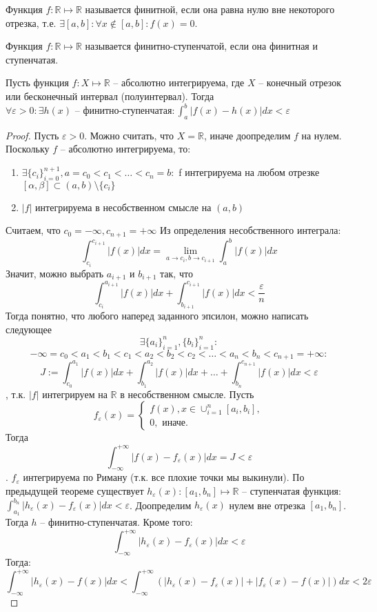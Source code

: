 \documentclass[document.tex]{subfiles}
\begin{document}
\begin{definition}
Функция $f: \mathbb{R} \mapsto \mathbb{R}$ называется финитной, если она равна нулю вне некоторого отрезка, т.е. $\exists [a, b] : \forall x \not \in [a, b] : f(x) = 0$.
\end{definition}

\begin{definition}
Функция $f : \mathbb{R} \mapsto \mathbb{R}$ называется финитно-ступенчатой, если она финитная и ступенчатая.
\end{definition}

\begin{theorem}
    Пусть функция $f : X \mapsto \mathbb{R}$ -- абсолютно интегрируема, где $X$ -- конечный отрезок или
    бесконечный интервал (полуинтервал). Тогда $\forall \varepsilon > 0: \exists h(x)\text{ -- финитно-ступенчатая} : \int_a^b|f(x)-h(x)|dx < \varepsilon$
\end{theorem}
\begin{proof}
Пусть $\varepsilon > 0$.
Можно считать, что $X = \mathbb{R}$, иначе доопределим $f$ на нулем.
Поскольку $f$ -- абсолютно интегрируема, то:

\begin{enumerate}
    \item $\exists \{c_i\}_{i=0}^{n+1}, a = c_0 < c_1 < \ldots < c_n = b:$ f интегрируема на любом отрезке $[\alpha, \beta] \subset (a, b) \setminus \{c_i\}$
\item $|f|$ интегрируема в несобственном смысле на $(a, b)$
\end{enumerate}
Считаем, что $c_0 = -\infty, c_{n+1} = +\infty$
Из определения несобственного интеграла:
\[
    \int_{c_i}^{c_{i+1}} |f(x)| dx = \lim_{a \rightarrow c_i, b \rightarrow c_{i+1}} \int_{a}^{b} |f(x)|dx
\]
Значит, можно выбрать $a_{i+1}$ и $b_{i+1}$ так, что
\[
    \int_{c_i}^{a_{i+1}} |f(x)|dx + \int_{b_{i+1}}^{c_{i+1}} |f(x)|dx < \frac{\varepsilon}{n}
\]
Тогда понятно, что любого наперед заданного эпсилон, можно написать следующее
$$\exists \{a_i\}_{i=1}^n, \{b_i\}_{i=1}^n:$$
\[-\infty = c_0 <  a_1 < b_1 < c_1 < a_2 < b_2 < c_2 < \ldots < a_n <
b_n < c_{n+1} = +\infty:
\]
$$J := \int_{c_0}^{a_1}|f(x)|dx + \int_{b_1}^{a_2}|f(x)|dx + \ldots + \int_{b_n}^{c_{n+1}}|f(x)|dx < \varepsilon$$, т.к. $|f|$ интегрируем на $\mathbb{R}$ в несобственном смысле. Пусть
$$f_{\varepsilon}(x) = \begin{cases}
    f(x), x \in \cup_{i = 1}^n [a_i, b_i], \\
    0, \text{ иначе}.
\end{cases}$$
Тогда $$\int_{-\infty}^{+\infty}|f(x) - f_{\varepsilon}(x)|dx = J < \varepsilon$$.
$f_{\varepsilon}$ интегрируема по Риману (т.к. все плохие точки мы выкинули). По предыдущей теореме существует $h_{\varepsilon}(x):[a_1, b_n] \mapsto \mathbb{R}$ -- ступенчатая функция: $\int_{a_1}^{b_n}|h_{\varepsilon}(x) - f_{\varepsilon}(x)|dx < \varepsilon$. Доопределим $h_{\varepsilon}(x)$ нулем вне отрезка $[a_1, b_n]$. Тогда $h$ -- финитно-ступенчатая. Кроме того:
$$\int_{-\infty}^{+\infty}|h_{\varepsilon}(x) - f_{\varepsilon}(x)|dx < \varepsilon$$
Тогда:
$$\int_{-\infty}^{+\infty}|h_{\varepsilon}(x) - f(x)|dx < \int_{-\infty}^{+\infty}(|h_{\varepsilon}(x) - f_{\varepsilon}(x)| + |f_{\varepsilon}(x) - f(x)|)dx < 2\varepsilon$$
\end{proof}
\end{document}
